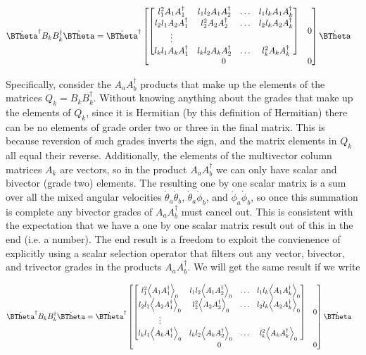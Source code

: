 \begin{align}\label{eqn:multiPendulumSpherical2:boo8}
\dot{\BTheta}^\dagger
B_k B_k^\dagger
\dot{\BTheta}
&=
\dot{\BTheta}^\dagger
\begin{bmatrix}
\begin{bmatrix}
l_1^2 A_1 A_1^\dagger & l_1 l_2 A_1 A_2^\dagger & \hdots & l_1 l_k A_1 A_k^\dagger \\
l_2 l_1 A_2 A_1^\dagger & l_2^2 A_2 A_2^\dagger & \hdots & l_2 l_k A_2 A_k^\dagger \\
\vdots \\
l_k l_1 A_k A_1^\dagger & l_k l_2 A_k A_2^\dagger & \hdots & l_k^2 A_k A_k^\dagger
\end{bmatrix} & 0 \\
0 & 0
\end{bmatrix}
\dot{\BTheta}
\end{align}

Specifically, consider the $A_a A_b^\dagger$ products that make up the elements of the matrices $Q_k = B_k B_k^\dagger$.  Without knowing anything about the grades that make up the elements of $Q_k$, since it is Hermitian (by this definition of Hermitian) there can be no elements of grade order two or three in the final matrix.  This is because reversion of such grades inverts the sign, and the matrix elements in $Q_k$ all equal their reverse.  Additionally, the elements of the multivector column matrices $A_k$ are vectors, so in the product $A_a A_b^\dagger$ we can only have scalar and bivector (grade two) elements.  The resulting one by one scalar matrix is a sum over all the mixed angular velocities $\dot{\theta}_a \dot{\theta}_b$, $\dot{\theta}_a \dot{\phi}_b$, and $\dot{\phi}_a \dot{\phi}_b$, so once this summation is complete any bivector grades of $A_a A_b^\dagger$ must cancel out.  This is consistent with the expectation that we have a one by one scalar matrix result out of this in the end (i.e. a number).  The end result is a freedom to exploit the convienence of explicitly using a scalar selection operator that filters out any vector, bivector, and trivector grades in the products $A_a A_b^\dagger$.  We will get the same result if we write

\begin{align}\label{eqn:multiPendulumSpherical2:boo9}
\dot{\BTheta}^\dagger
B_k B_k^\dagger
\dot{\BTheta}
&=
\dot{\BTheta}^\dagger
\begin{bmatrix}
\begin{bmatrix}
l_1^2 \gpgradezero{A_1 A_1^\dagger} & l_1 l_2 \gpgradezero{A_1 A_2^\dagger} & \hdots & l_1 l_k \gpgradezero{A_1 A_k^\dagger} \\
l_2 l_1 \gpgradezero{A_2 A_1^\dagger} & l_2^2 \gpgradezero{A_2 A_2^\dagger} & \hdots & l_2 l_k \gpgradezero{A_2 A_k^\dagger} \\
\vdots \\
l_k l_1 \gpgradezero{A_k A_1^\dagger} & l_k l_2 \gpgradezero{A_k A_2^\dagger} & \hdots & l_k^2 \gpgradezero{A_k A_k^\dagger}
\end{bmatrix} & 0 \\
0 & 0
\end{bmatrix}
\dot{\BTheta}
\end{align}

